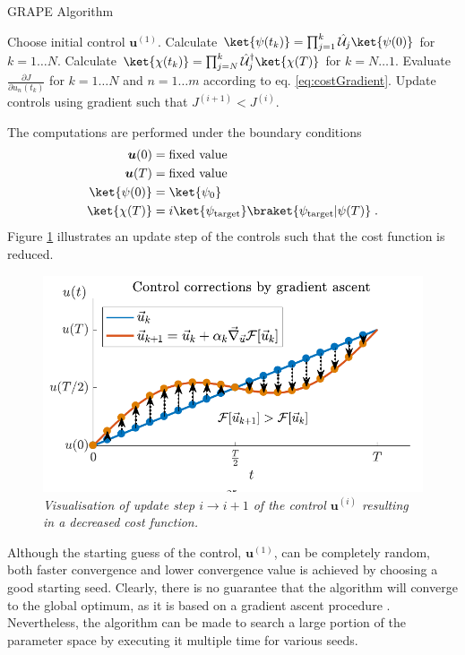 \begin{algorithm}
\begin{algorithmic}
\caption{GRAPE Algorithm}
\State Choose initial control $\boldsymbol{u}^{(1)}$.
	\State Calculate $\ket{\psi (t_k)} = \prod_{j=1}^{k} \hat{\mathcal{U}}_j \ket{\psi (0)}$ for $k = 1 \ldots N$.
	\State Calculate $\ket{\chi (t_k)} = \prod_{j=N}^{k} \hat{\mathcal{U}}_{j}^{\dag} \ket{\chi (T)}$ for $k = N \ldots 1$. 
	\State Evaluate $\frac{\partial J}{\partial u_n (t_k)}$ for $k = 1 \ldots N$ and $n = 1 \ldots m$ according to eq. \eqref{eq:costGradient}.
	\State Update controls using gradient such that $J^{(i + 1)} < J^{(i)}$. 
\EndWhile
\end{algorithmic}
\end{algorithm}
The computations are performed under the boundary conditions
\begin{align}
	\boldsymbol{u}(0) &= \text{fixed value} \label{eq:firstBound} \\
	\boldsymbol{u}(T) &= \text{fixed value} \\
	\ket{\psi (0)} &= \ket{\psi_0} \\
	\ket{\chi (T)} &= i \ket{\psi_{\mathrm{target}}} \braket{\psi_{\mathrm{target}} | \psi (T)} \; .  \label{eq:lastBound}
\end{align}
Figure \ref{fig:ControlUpdate} illustrates an update step of the controls such that the cost function is reduced.
\begin{figure}[!h]
	\centering
	\includegraphics[width=0.7\columnwidth]{Figures/ControlUpdate.pdf} 
	\caption{ \textit{Visualisation of update step $i \to i+1$ of the control $\boldsymbol{u}^{(i)}$ resulting in a decreased cost function.}}
	\label{fig:ControlUpdate} 
\end{figure} 
Although the starting guess of the control, $\boldsymbol{u}^{(1)}$, can be completely random, both faster convergence and lower convergence value is achieved by choosing a good starting seed. Clearly, there is no guarantee that the algorithm will converge to the global optimum, as it is based on a gradient ascent procedure \cite{Khaneja2005}. Nevertheless, the algorithm can be made to search a large portion of the parameter space by executing it multiple time for various seeds.  


